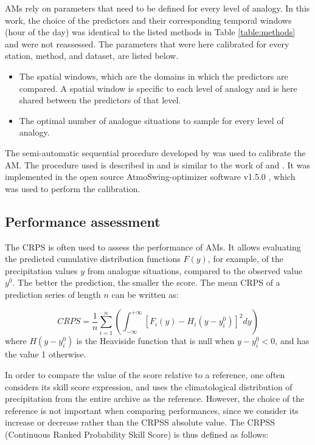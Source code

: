 \documentclass{ametsoc}
\begin{document}
AMs rely on parameters that need to be defined for every level of analogy. In this work, the choice of the predictors and their corresponding temporal windows (hour of the day) was identical to the listed methods in Table \ref{table:methods} and were not reassessed. The parameters that were here calibrated for every station, method, and dataset, are listed below.

\begin{itemize}
	\item The spatial windows, which are the domains in which the predictors are compared. A spatial window is specific to each level of analogy and is here shared between the predictors of that level.
	\item The optimal number of analogue situations to sample for every level of analogy.
\end{itemize}

The semi-automatic sequential procedure developed by \citet{Bontron2004} was used to calibrate the AM. The procedure used is described in \citet{Horton2017c} and is similar to the work of \citet{Radanovics2013} and \citet{BenDaoud2016}. It was implemented in the open source AtmoSwing-optimizer software v1.5.0 \citep[www.atmoswing.org,][]{Horton2017a}, which was used to perform the calibration.


\subsection{Performance assessment}

The CRPS \citep[Continuous Ranked Probability Score,][]{Brown1974, Matheson1976, Hersbach2000} is often used to assess the performance of AMs. It allows evaluating the predicted cumulative distribution functions $F(y)$, for example, of the precipitation values $y$ from analogue situations, compared to the observed value $y^{0}$. The better the prediction, the smaller the score. The mean CRPS of a prediction series of length $n$ can be written as:

\begin{equation}
\label{eq:CRPS}
CRPS = \frac{1}{n} \sum_{i=1}^{n} \left(  \int_{-\infty}^{+\infty} \left[ F_{i}(y)-H_{i}(y-y_{i}^{0})\right]^{2} dy \right) 
\end{equation}
where $H(y-y_{i}^{0})$ is the Heaviside function that is null when $y-y_{i}^{0}<0$, and has the value 1 otherwise.

In order to compare the value of the score relative to a reference, one often considers its skill score expression, and uses the climatological distribution of precipitation from the entire archive as the reference. However, the choice of the reference is not important when comparing performances, since we consider its increase or decrease rather than the CRPSS absolute value. The CRPSS (Continuous Ranked Probability Skill Score) is thus defined as follows:
\end{document}
